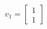 \documentclass{article}
\begin{document}
\begin{align*}
v_1 = \begin{bmatrix}1\\1\end{bmatrix}
\end{align*}
\end{document}
